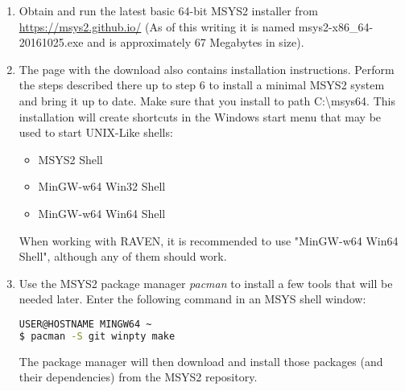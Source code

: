 \begin{enumerate}
    \item Obtain and run the latest basic 64-bit MSYS2 installer from \url{ https://msys2.github.io/} (As of this writing it is named
	msys2-x86\_64-20161025.exe and is approximately 67 Megabytes in size).
    \item The page with the download also contains installation instructions. Perform the steps described there up to
	step 6 to install a minimal MSYS2 system and bring it up to date. Make sure that you install to path
        C:\textbackslash{}msys64.  This installation will create shortcuts in the Windows start menu that may be used
        to start UNIX-Like shells:
		\begin{itemize}
	    		\item MSYS2 Shell
	    		\item MinGW-w64 Win32 Shell
	    		\item MinGW-w64 Win64 Shell
		\end{itemize}
        When working with RAVEN, it is recommended to use "MinGW-w64 Win64 Shell", although any of them should work.
    \item Use the MSYS2 package manager {\it pacman} to install a few tools that will be needed later.  Enter the following command in an MSYS shell window:

\begin{lstlisting}[language=bash]
USER@HOSTNAME MINGW64 ~
$ pacman -S git winpty make
\end{lstlisting}
	The package manager will then download and install those packages (and their dependencies) from the MSYS2
	repository.
\end{enumerate}

